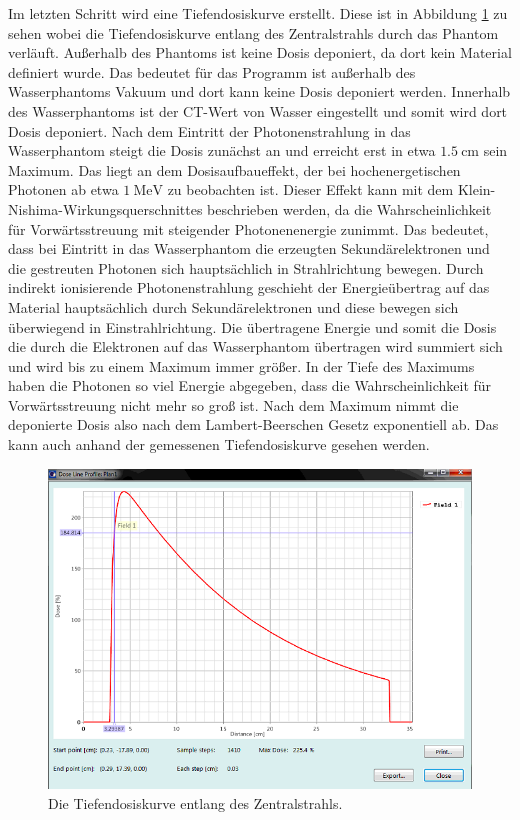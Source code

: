 Im letzten Schritt wird eine Tiefendosiskurve erstellt. Diese ist in Abbildung \ref{fig:aufgabe215} zu sehen wobei die Tiefendosiskurve entlang des Zentralstrahls durch das Phantom verläuft. Außerhalb des Phantoms ist keine Dosis deponiert, da dort kein Material
definiert wurde. Das bedeutet für das Programm ist außerhalb des Wasserphantoms Vakuum und
dort kann keine Dosis deponiert werden.
Innerhalb des Wasserphantoms ist der CT-Wert von Wasser eingestellt und somit wird dort
Dosis deponiert. Nach dem Eintritt der Photonenstrahlung in das Wasserphantom steigt die
Dosis zunächst an und erreicht erst in etwa $\SI{1.5}{\centi\meter}$ sein Maximum.
Das liegt an dem Dosisaufbaueffekt, der bei hochenergetischen Photonen ab etwa
$\SI{1}{\mega\eV}$ zu beobachten ist. Dieser Effekt kann mit dem Klein-Nishima-Wirkungsquerschnittes beschrieben werden, da die Wahrscheinlichkeit für Vorwärtsstreuung
mit steigender Photonenenergie zunimmt. Das bedeutet, dass bei Eintritt in das
Wasserphantom die erzeugten Sekundärelektronen und die gestreuten Photonen sich
hauptsächlich in Strahlrichtung bewegen. Durch indirekt ionisierende Photonenstrahlung
geschieht der Energieübertrag auf das Material hauptsächlich durch Sekundärelektronen und
diese bewegen sich überwiegend in Einstrahlrichtung. Die übertragene Energie und somit die Dosis
die durch die Elektronen auf das Wasserphantom übertragen wird summiert sich und wird bis
zu einem Maximum immer größer. In der Tiefe des Maximums haben die Photonen so viel Energie
abgegeben, dass die Wahrscheinlichkeit für Vorwärtsstreuung nicht mehr so groß ist.
Nach dem Maximum nimmt die deponierte Dosis also nach dem Lambert-Beerschen Gesetz exponentiell
ab. Das kann auch anhand der gemessenen Tiefendosiskurve gesehen werden. \cite{grundlagen}


\begin{figure}[H]
	\centering
	\includegraphics[width=0.7\linewidth]{../../Wasserphantom Bilder/Aufgabe215.png}
	\caption{Die Tiefendosiskurve entlang des Zentralstrahls.}
	\label{fig:aufgabe215}
\end{figure}

